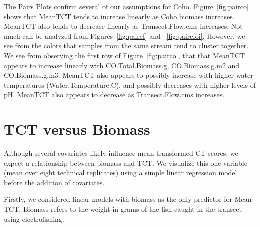 \newpage

The Pairs Plots confirm several of our assumptions for Coho. Figure~\ref{fig:pairco} shows that MeanTCT tends to increase linearly as Coho biomass increases. MeanTCT also tends to decrease linearly as Transect.Flow.cms increases. Not much can be analyzed from Figures~\ref{fig:pairef} and ~\ref{fig:pairefoi}. However, we see from the colors that samples from the same stream tend to cluster together. We see from observing the first row of Figure~\ref{fig:pairco}, that that MeanTCT appears to increase linearly with CO.Total.Biomass.g, CO.Biomass.g.m2 and CO.Biomass.g.m3. MeanTCT also appears to possibly increase with higher water temperatures (Water.Temperature.C), and possibly decreases with higher levels of pH. MeanTCT also appears to decrease as Transect.Flow.cms increases.



\newpage

\section{TCT versus Biomass}

Although several covariates likely influence mean transformed CT scores, we expect a relationship between biomass and TCT. We visualize this one variable (mean over eight technical replicates) using a simple linear regression model before the addition of covariates.


Firstly, we considered linear models with biomass as the only predictor for Mean TCT.  Biomass refers to the weight in grams of the fish caught in the transect using electrofishing. 

\vspace{3mm}



